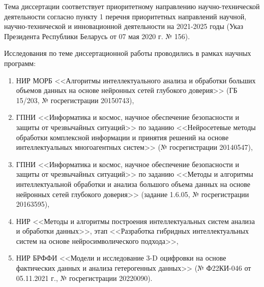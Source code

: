 {\actuality}
\vspace{3mm}

Тема диссертации соответствует приоритетному направлению научно-технической деятельности согласно пункту 1 перечня приоритетных направлений научной, научно-технической и инновационной деятельности на 2021-2025 годы  (Указ Президента Республики Беларусь от 07 мая 2020 г. № 156).

Исследования по теме диссертационной работы проводились в рамках научных программ:
\begin{enumerate}[wide, labelindent=10mm]
\item НИР МОРБ <<Алгоритмы интеллектуального анализа и обработки больших объемов данных на основе нейронных сетей глубокого доверия>> (ГБ 15/203, № госрегистрации 20150743),
\item ГПНИ <<Информатика и космос, научное обеспечение безопасности и защиты от чрезвычайных ситуаций>> по заданию <<Нейросетевые методы обработки комплексной информации и принятия решений на основе интеллектуальных многоагентных систем>> (№ госрегистрации 20140547),
\item ГПНИ <<Информатика и космос, научное обеспечение безопасности и защиты от чрезвычайных ситуаций>> по заданию <<Методы и алгоритмы интеллектуальной обработки и анализа большого объема данных на основе нейронных сетей глубокого доверия>> (задание 1.6.05, № госрегистрации 20163595),
\item НИР <<Методы и алгоритмы построения интеллектуальных систем анализа и обработки данных>>, этап <<Разработка гибридных интеллектуальных систем на основе нейросимволического подхода>>,
\item НИР БРФФИ <<Модели и исследование 3-D оцифровки на основе фактических данных и анализа гетерогенных данных>> (№ Ф22КИ-046 от 05.11.2021 г., № госрегистрации 20220090).
\end{enumerate}




